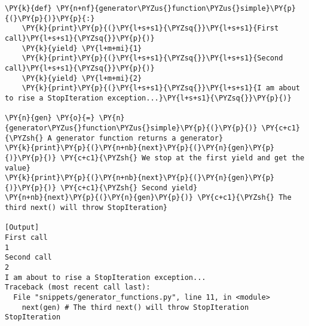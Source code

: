 \begin{Verbatim}[label=\makebox{\url{https://github.com/lucabaldini/cmepda/tree/master/slides/latex/snippets/generator\_functions.py}},commandchars=\\\{\}]
\PY{k}{def} \PY{n+nf}{generator\PYZus{}function\PYZus{}simple}\PY{p}{(}\PY{p}{)}\PY{p}{:}
    \PY{k}{print}\PY{p}{(}\PY{l+s+s1}{\PYZsq{}}\PY{l+s+s1}{First call}\PY{l+s+s1}{\PYZsq{}}\PY{p}{)}
    \PY{k}{yield} \PY{l+m+mi}{1}
    \PY{k}{print}\PY{p}{(}\PY{l+s+s1}{\PYZsq{}}\PY{l+s+s1}{Second call}\PY{l+s+s1}{\PYZsq{}}\PY{p}{)}
    \PY{k}{yield} \PY{l+m+mi}{2}
    \PY{k}{print}\PY{p}{(}\PY{l+s+s1}{\PYZsq{}}\PY{l+s+s1}{I am about to rise a StopIteration exception...}\PY{l+s+s1}{\PYZsq{}}\PY{p}{)}

\PY{n}{gen} \PY{o}{=} \PY{n}{generator\PYZus{}function\PYZus{}simple}\PY{p}{(}\PY{p}{)} \PY{c+c1}{\PYZsh{} A generator function returns a generator}
\PY{k}{print}\PY{p}{(}\PY{n+nb}{next}\PY{p}{(}\PY{n}{gen}\PY{p}{)}\PY{p}{)} \PY{c+c1}{\PYZsh{} We stop at the first yield and get the value}
\PY{k}{print}\PY{p}{(}\PY{n+nb}{next}\PY{p}{(}\PY{n}{gen}\PY{p}{)}\PY{p}{)} \PY{c+c1}{\PYZsh{} Second yield}
\PY{n+nb}{next}\PY{p}{(}\PY{n}{gen}\PY{p}{)} \PY{c+c1}{\PYZsh{} The third next() will throw StopIteration}

[Output]
First call
1
Second call
2
I am about to rise a StopIteration exception...
Traceback (most recent call last):
  File "snippets/generator_functions.py", line 11, in <module>
    next(gen) # The third next() will throw StopIteration
StopIteration
\end{Verbatim}
